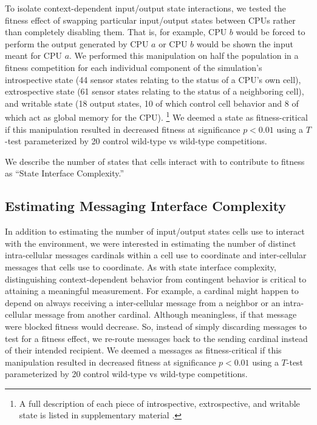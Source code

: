 To isolate context-dependent input/output state interactions, we tested the fitness effect of swapping particular input/output states between CPUs rather than completely disabling them.
That is, for example, CPU $b$ would be forced to perform the output generated by CPU $a$ or CPU $b$ would be shown the input meant for CPU $a$.
We performed this manipulation on half the population in a fitness competition for each individual component of the simulation's introspective state (44 sensor states relating to the status of a CPU's own cell), extrospective state (61 sensor states relating to the status of a neighboring cell), and writable state (18 output states, 10 of which control cell behavior and 8 of which act as global memory for the CPU).
\footnote{
A full description of each piece of introspective, extrospective, and writable state is listed in supplementary material \citep{Moreno_2021}.
}
We deemed a state as fitness-critical if this manipulation resulted in decreased fitness at significance $p < 0.01$ using a $T$-test parameterized by 20 control wild-type vs wild-type competitions.

We describe the number of states that cells interact with to contribute to fitness as ``State Interface Complexity.''

\subsection{Estimating Messaging Interface Complexity}

In addition to estimating the number of input/output states cells use to interact with the environment, we were interested in estimating the number of distinct intra-cellular messages cardinals within a cell use to coordinate and inter-cellular messages that cells use to coordinate.
As with state interface complexity, distinguishing context-dependent behavior from contingent behavior is critical to attaining a meaningful measurement.
For example, a cardinal might happen to depend on always receiving a inter-cellular message from a neighbor or an intra-cellular message from another cardinal.
Although meaningless, if that message were blocked fitness would decrease.
So, instead of simply discarding messages to test for a fitness effect, we re-route messages back to the sending cardinal instead of their intended recipient. 
We deemed a messages as fitness-critical if this manipulation resulted in decreased fitness at significance $p < 0.01$ using a $T$-test parameterized by 20 control wild-type vs wild-type competitions.

